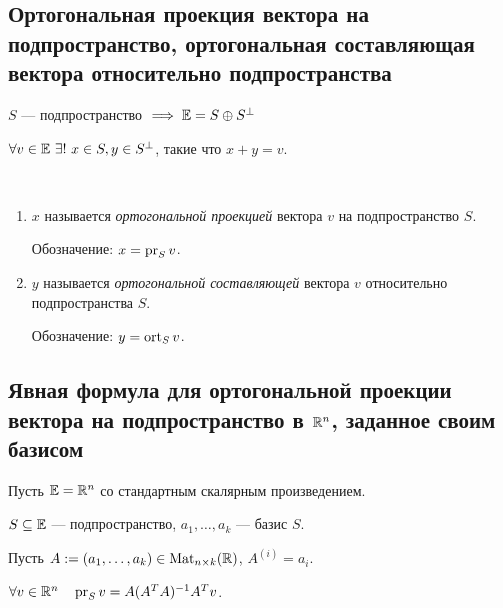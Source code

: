 \subsection{Ортогональная проекция вектора на подпространство, ортогональная составляющая вектора относительно подпространства}

$S$ --- подпространство $ \implies \mathbb{E} = S \oplus S^{\perp}$

$\forall v \in \mathbb{E} \ \exists! \ x \in S, y \in S^{\perp}$, такие что $x + y = v$.

\begin{definition}~
    \begin{enumerate}
    \item 
        $x$ называется \textit{ортогональной проекцией} вектора $v$ на подпространство $S$.

        Обозначение: $x = \operatorname{\mathop{\mathrm{pr}}}_S v$.

    \item
        $y$ называется \textit{ортогональной составляющей} вектора $v$ относительно подпространства $S$.

        Обозначение: $y = \operatorname{\mathop{\mathrm{ort}}}_S v$.
    \end{enumerate}
\end{definition}

\subsection{Явная формула для ортогональной проекции вектора на подпространство в $\mathbb{R}^n$, заданное своим базисом}

Пусть $\mathbb{E} = \mathbb{R}^n$ со стандартным скалярным произведением.

$S \subseteq \mathbb{E}$ --- подпространство, $a_1, \dots, a_k$ --- базис $S$.

Пусть $A := (a_1, \dots, a_k) \in \text{Mat}_{n \times k}(\mathbb{R})$, $A^{(i)} = a_i$.

\begin{proposal}
    $\forall v \in \mathbb{R}^n \quad \operatorname{\mathop{\mathrm{pr}}}_S v = A (A^{T} A)^{-1} A^{T} v$.
\end{proposal}

